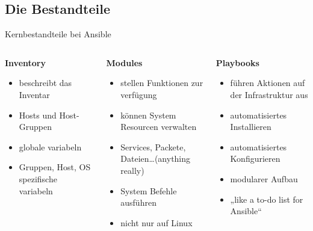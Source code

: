 \documentclass[aspectratio=169]{beamer}
\begin{document}
\subsection{Die Bestandteile} 
\begin{frame}{Kernbestandteile bei Ansible}
    \begin{columns}
        \begin{column}{0.33\textwidth}
            \textbf{Inventory}
            \begin{itemize}
                \item beschreibt das Inventar
                \item Hosts und Host-Gruppen
                \item globale variabeln
                \item Gruppen, Host, OS spezifische variabeln
            \end{itemize}
        \end{column}
        \pause
        \begin{column}{0.33\textwidth}
            \textbf{Modules}
            \begin{itemize}
                \item stellen Funktionen zur verfügung
                \item können System Resourcen verwalten
                \item Services, Packete, Dateien\ldots (anything really)
                \item System Befehle ausführen
                \item nicht nur auf Linux
            \end{itemize}
        \end{column}
        \pause
        \begin{column}{0.34\textwidth}
            \textbf{Playbooks}
            \begin{itemize}
                \item führen Aktionen auf der Infrastruktur aus
                \item automatisiertes Installieren
                \item automatisiertes Konfigurieren
                \item modularer Aufbau
                \item „like a to-do list for Ansible“
            \end{itemize}
        \end{column}
    \end{columns}
\end{frame}
\end{document}
